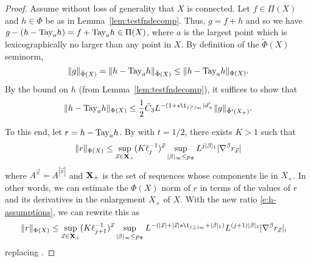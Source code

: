 \begin{proof}
Assume without loss of generality that $X$ is connected.
Let $f\in\Pi(X)$ and $h\in\Phi$ be as in Lemma~\ref{lem:testfndecomp}.
Thus, $g = f + h$ and so
we have $g - (h - {\rm Tay}_a h) = f + {\rm Tay}_a h \in \Pi(X)$, where $a$ is the largest
point which is lexicographically no larger than any point in $X$.
By definition of the $\tilde\Phi(X)$ seminorm,
\begin{equation}
\|g\|_{\tilde\Phi(X)}
	=
\|h - {\rm Tay}_a h\|_{\tilde\Phi(X)}
	\le
\|h - {\rm Tay}_a h\|_{\Phi(X)}.
\end{equation}
By the bound on $h$ (from Lemma~\ref{lem:testfndecomp}), it suffices to
show that
\begin{equation}
\|h - \Tay_a h\|_{\Phi(X)}
	\le
\frac12 \bar C_3 L^{-(1 + s \1_{j \ge j_m}) d'_+} \|g\|_{\tilde\Phi'(X_+)}.
\end{equation}

To this end, let $r = h - {\rm Tay}_a h$. By \cite[Lemma~\ref{loc-lem:gX}]{BS-rg-loc}
with $t = 1/2$, there exists $K > 1$ such that
\begin{equation}
\|r\|_{\Phi(X)}
	\le
\sup_{\vec x \in \bf{X}_+}
	(K \ell_j^{-1})^{\vec x}
\sup_{|\beta|_\infty \le p_\Phi}
	L^{j |\beta|_1} |\nabla^\beta r_{\vec x}|
\end{equation}
where $A^{\vec x} = A^{|\vec x|}$ and $\bf{X}_+$ is the set of sequences whose
components lie in $X_+$. In other words, we can estimate the $\Phi(X)$
norm of $r$ in terms of the values of $r$ and its derivatives in the enlargement
$X_+$ of $X$.
With the new ratio \eqref{e:h-assumptions},
we can rewrite this as
\begin{align}
\label{e:rhognew-improved}
\|r\|_{\Phi (X)}
	& \le
\sup_{{\vec x} \in {\mathbf X}_+}
	(K\ell_{j+1}^{-1})^{\vec x}
\sup_{|\beta|_\infty \le p_\Phi}
	L^{-(|{\vec x}| + |{\vec x}| s \1_{{j\geq j_m}} +|\beta|_1)}
	L^{(j+1) |\beta|_1}
	| \nabla^\beta  r_{{\vec x}}  |,
\end{align}
replacing \cite[\eqref{loc-e:rhognew}]{BS-rg-loc}.


\end{proof}
